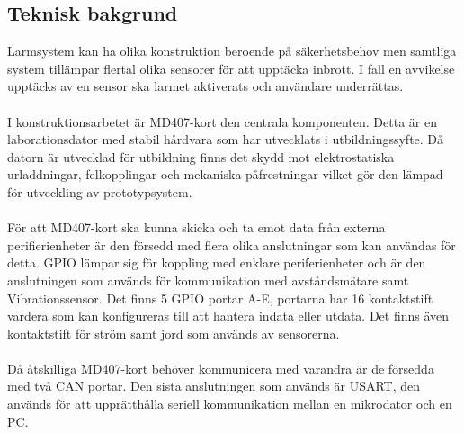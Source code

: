 \documentclass{article}
\begin{document}
\subsection{Teknisk bakgrund}
Larmsystem kan ha olika konstruktion beroende på säkerhetsbehov men samtliga system tillämpar flertal olika sensorer för att upptäcka inbrott. 
I fall en avvikelse upptäcks av en sensor ska larmet aktiverats och användare underrättas.
\\
\\
I konstruktionsarbetet är MD407-kort den centrala komponenten. 
Detta är en laborationsdator med stabil hårdvara som har utvecklats i utbildningssyfte. 
Då datorn är utvecklad för utbildning finns det skydd mot elektrostatiska urladdningar, felkopplingar och mekaniska påfrestningar vilket gör den lämpad för utveckling av prototypsystem.
\\
\\
För att MD407-kort ska kunna skicka och ta emot data från externa perifierienheter är den försedd med flera olika anslutningar som kan användas för detta. 
GPIO lämpar sig för koppling med enklare periferienheter och är den anslutningen som används för kommunikation med avståndsmätare samt Vibrationssensor. 
Det finns 5 GPIO portar A-E, portarna har 16 kontaktstift vardera som kan konfigureras till att hantera indata eller utdata. 
Det finns även kontaktstift för ström samt jord som används av sensorerna.
\\
\\
Då åtskilliga MD407-kort behöver kommunicera med varandra är de försedda med två CAN portar. Den sista anslutningen som används är USART, den används för att upprätthålla seriell kommunikation mellan en mikrodator och en PC.

\newpage
\end{document}
